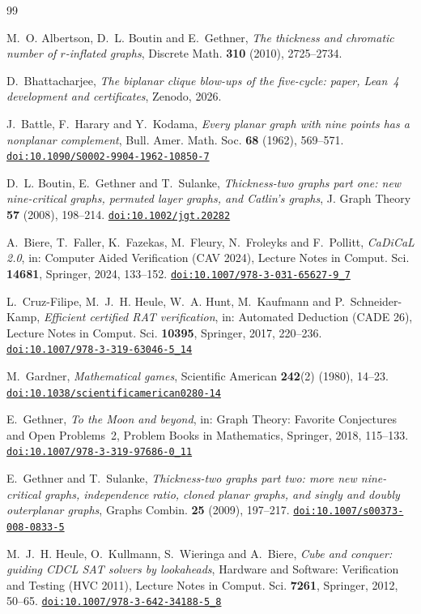 \documentclass[11pt]{amsart}
\theoremstyle{definition}
\theoremstyle{remark}
\numberwithin{equation}{section}
\newcommand{\doi}[1]{\href{https://doi.org/#1}{\nolinkurl{doi:#1}}}
\begin{document}
\begin{thebibliography}{99}

M.~O. Albertson, D.~L. Boutin and E.~Gethner, \emph{The thickness and chromatic number of $r$-inflated graphs}, Discrete Math. \textbf{310} (2010), 2725--2734.

D.~Bhattacharjee, \emph{The biplanar clique blow-ups of the five-cycle: paper, Lean~4 development and certificates}, Zenodo, 2026. %

J.~Battle, F.~Harary and Y.~Kodama, \emph{Every planar graph with nine points has a nonplanar complement}, Bull. Amer. Math. Soc. \textbf{68} (1962), 569--571. \doi{10.1090/S0002-9904-1962-10850-7}

D.~L. Boutin, E.~Gethner and T.~Sulanke, \emph{Thickness-two graphs part one: new nine-critical graphs, permuted layer graphs, and Catlin's graphs}, J. Graph Theory \textbf{57} (2008), 198--214. \doi{10.1002/jgt.20282}

A.~Biere, T.~Faller, K.~Fazekas, M.~Fleury, N.~Froleyks and F.~Pollitt, \emph{CaDiCaL 2.0}, in: Computer Aided Verification (CAV 2024), Lecture Notes in Comput. Sci. \textbf{14681}, Springer, 2024, 133--152. \doi{10.1007/978-3-031-65627-9_7}

L.~Cruz-Filipe, M.~J.~H. Heule, W.~A. Hunt, M.~Kaufmann and P.~Schneider-Kamp, \emph{Efficient certified RAT verification}, in: Automated Deduction (CADE 26), Lecture Notes in Comput. Sci. \textbf{10395}, Springer, 2017, 220--236. \doi{10.1007/978-3-319-63046-5_14}

M.~Gardner, \emph{Mathematical games}, Scientific American \textbf{242}(2) (1980), 14--23. \doi{10.1038/scientificamerican0280-14}

E.~Gethner, \emph{To the Moon and beyond}, in: Graph Theory: Favorite Conjectures and Open Problems~2, Problem Books in Mathematics, Springer, 2018, 115--133. \doi{10.1007/978-3-319-97686-0_11}

E.~Gethner and T.~Sulanke, \emph{Thickness-two graphs part two: more new nine-critical graphs, independence ratio, cloned planar graphs, and singly and doubly outerplanar graphs}, Graphs Combin. \textbf{25} (2009), 197--217. \doi{10.1007/s00373-008-0833-5}

M.~J.~H. Heule, O.~Kullmann, S.~Wieringa and A.~Biere, \emph{Cube and conquer: guiding CDCL SAT solvers by lookaheads}, Hardware and Software: Verification and Testing (HVC 2011), Lecture Notes in Comput. Sci. \textbf{7261}, Springer, 2012, 50--65. \doi{10.1007/978-3-642-34188-5_8}


\end{thebibliography}
\end{document}
